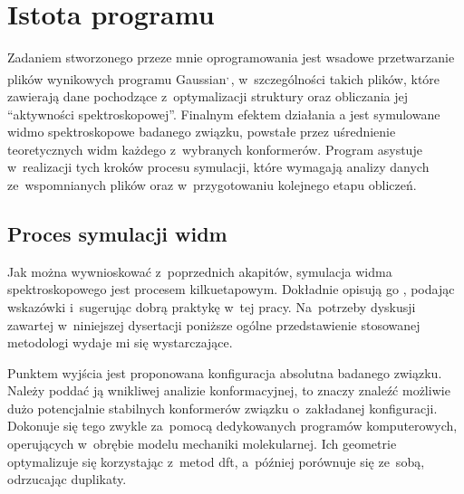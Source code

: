 \section{Istota programu}\label{tesliper:essence}
Zadaniem stworzonego przeze mnie oprogramowania jest wsadowe przetwarzanie plików wynikowych
  programu Gaussian\textsuperscript{,\,},
  w~szczególności takich plików, które zawierają dane pochodzące z~optymalizacji struktury
  oraz obliczania jej \enquote{aktywności spektroskopowej}.
Finalnym efektem działania \tesliper{}a jest symulowane widmo spektroskopowe badanego związku,
  powstałe przez uśrednienie teoretycznych widm każdego z~wybranych konformerów.
Program asystuje w~realizacji tych kroków procesu symulacji, które wymagają analizy danych
  ze~wspomnianych plików oraz w~przygotowaniu kolejnego etapu obliczeń.

\subsection{Proces symulacji widm}\label{essence:simulation}
Jak można wywnioskować z~poprzednich akapitów, symulacja widma spektroskopowego jest
  procesem kilkuetapowym.
Dokładnie opisują go \citeauthor{pescitelli16}, podając wskazówki i~sugerując dobrą
  praktykę w~tej pracy.
Na~potrzeby dyskusji zawartej w~niniejszej dysertacji poniższe ogólne przedstawienie
  stosowanej metodologi wydaje mi się wystarczające.

Punktem wyjścia jest proponowana konfiguracja absolutna badanego związku.
Należy poddać ją wnikliwej analizie konformacyjnej, to znaczy znaleźć możliwie dużo
  potencjalnie stabilnych konformerów związku o~zakładanej konfiguracji.
Dokonuje się tego zwykle za~pomocą dedykowanych programów komputerowych, operujących w~obrębie
  modelu mechaniki molekularnej.
Ich geometrie optymalizuje się korzystając z~metod \gls{dft}, a~później porównuje się ze~sobą,
  odrzucając duplikaty.

